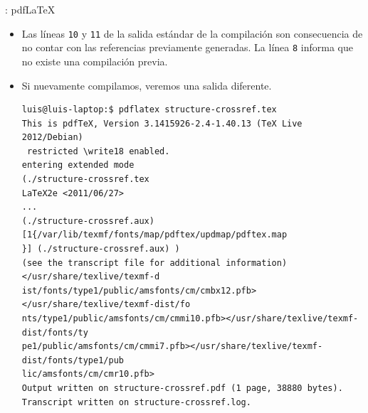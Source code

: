 \documentclass[draft]{beamer}
\begin{document}
\begin{frame}[fragile]{\insertsection: pdf\LaTeX{}}
  \begin{itemize}
  \item Las líneas \texttt{10} y \texttt{11} de la salida estándar de
    la compilación son consecuencia de no contar con las referencias
    previamente generadas. La línea \texttt{8} informa que no existe
    una compilación previa.
  \item Si nuevamente compilamos, veremos una salida diferente.
    \begin{center}
      \begin{verbatim}
luis@luis-laptop:$ pdflatex structure-crossref.tex 
This is pdfTeX, Version 3.1415926-2.4-1.40.13 (TeX Live 2012/Debian)
 restricted \write18 enabled.
entering extended mode
(./structure-crossref.tex
LaTeX2e <2011/06/27>
...
(./structure-crossref.aux) [1{/var/lib/texmf/fonts/map/pdftex/updmap/pdftex.map
}] (./structure-crossref.aux) )
(see the transcript file for additional information)</usr/share/texlive/texmf-d
ist/fonts/type1/public/amsfonts/cm/cmbx12.pfb></usr/share/texlive/texmf-dist/fo
nts/type1/public/amsfonts/cm/cmmi10.pfb></usr/share/texlive/texmf-dist/fonts/ty
pe1/public/amsfonts/cm/cmmi7.pfb></usr/share/texlive/texmf-dist/fonts/type1/pub
lic/amsfonts/cm/cmr10.pfb>
Output written on structure-crossref.pdf (1 page, 38880 bytes).
Transcript written on structure-crossref.log.
      \end{verbatim}
    \end{center}
  \end{itemize}
\end{frame}
\end{document}
